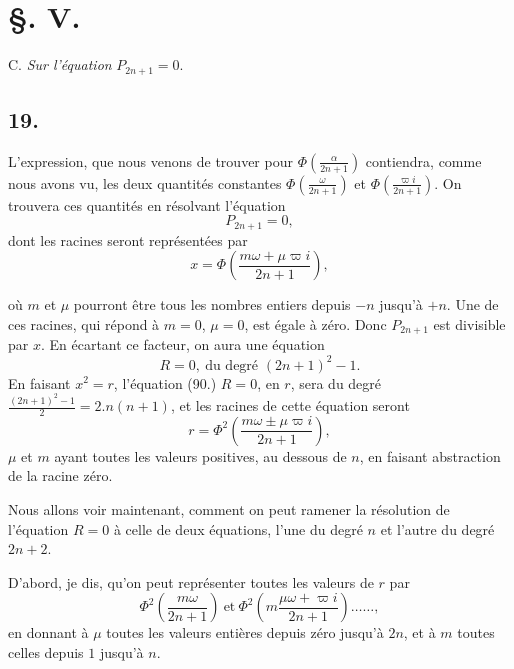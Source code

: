 \documentclass{article}
\begin{document}
\section*{§. V.}

C. \emph{Sur l'équation} $P_{2n+1}=0$.

\subsection*{19.}

L'expression, que nous venons de trouver pour $\Phi\left(\frac{\alpha}{2n+1}\right)$ contiendra, comme nous avons vu, les deux quantités constantes $\Phi\left(\frac{\omega}{2n+1}\right)$ et $\Phi\left(\frac{\varpi i}{2n+1}\right)$. On trouvera ces quantités en résolvant l'équation
\[ P_{2n+1}=0, \]
dont les racines seront représentées par
\[ x=\Phi\left(\frac{m\omega+\mu\varpi i}{2n+1}\right), \]

où $m$ et $\mu$ pourront être tous les nombres entiers depuis $-n$ jusqu'à $+n$. Une de ces racines, qui répond à $m=0$, $\mu=0$, est égale à zéro. Donc $P_{2n+1}$ est divisible par $x$. En écartant ce facteur, on aura une équation
\[ R=0,\ \text{du degré }(2n+1)^{2}-1. \]
En faisant $x^{2}=r$, l'équation (90.) $R=0$, en $r$, sera du degré $\frac{(2n+1)^{2}-1}{2}=2.n(n+1)$, et les racines de cette équation seront
\[ r=\Phi^{2}\left(\frac{m\omega\pm\mu\varpi i}{2n+1}\right), \tag{91.} \]
$\mu$ et $m$ ayant toutes les valeurs positives, au dessous de $n$, en faisant abstraction de la racine zéro.

Nous allons voir maintenant, comment on peut ramener la résolution de l'équation $R=0$ à celle de deux équations, l'une du degré $n$ et l'autre du degré $2n+2$.

D'abord, je dis, qu'on peut représenter toutes les valeurs de $r$ par
\[ \Phi^{2}\left(\frac{m\omega}{2n+1}\right)\ \text{et}\ \Phi^{2}\left(m\frac{\mu\omega+\varpi i}{2n+1}\right)\ldots\ldots, \tag{92.} \]
en donnant à $\mu$ toutes les valeurs entières depuis zéro jusqu'à $2n$, et à $m$ toutes celles depuis $1$ jusqu'à $n$.
\end{document}
